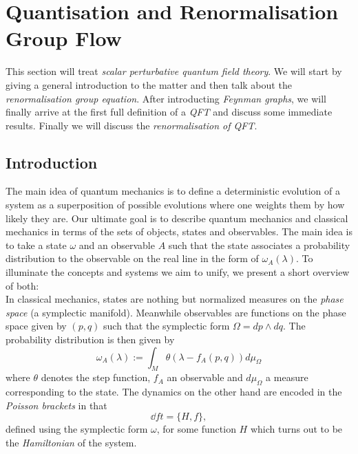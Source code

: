 \section{Quantisation and Renormalisation Group Flow}
\label{sec:Renormalisation}

This section will treat \emph{scalar perturbative quantum field theory}. We will start by giving a general introduction to the matter and then talk about the \emph{renormalisation group equation}. After introducting \emph{Feynman graphs}, we will finally arrive at the first full definition of a \emph{QFT} and discuss some immediate results. Finally we will discuss the \emph{renormalisation of QFT}.

\subsection{Introduction}
\label{subsec:quantisation_intro}

The main idea of quantum mechanics is to define a deterministic evolution of a system as a superposition of possible evolutions where one weights them by how likely they are. Our ultimate goal is to describe quantum mechanics and classical mechanics in terms of the sets of objects, states and observables. The main idea is to take a state $\omega$ and an observable $A$ such that the state associates a probability distribution to the observable on the real line in the form of $\omega_A(\lambda)$. To illuminate the concepts and systems we aim to unify, we present a short overview of both:\\

In classical mechanics, states are nothing but normalized measures on the \emph{phase space} (a symplectic manifold). Meanwhile observables are functions on the phase space given by $(p,q)$ such that the symplectic form $\Omega = dp \wedge dq$. The probability distribution is then given by
\begin{equation} \omega_A (\lambda) := \int_M \theta(\lambda - f_A (p,q)) d \mu_\Omega\end{equation}
where $\theta$ denotes the step function, $f_A$ an observable and $d\mu_\Omega$ a measure corresponding to the state. The dynamics on the other hand are encoded in the \emph{Poisson brackets} in that
\begin{equation} \dd{f}{t} = \{H, f\},\end{equation}
defined using the symplectic form $\omega$, for some function $H$ which turns out to be the \emph{Hamiltonian} of the system.\\

